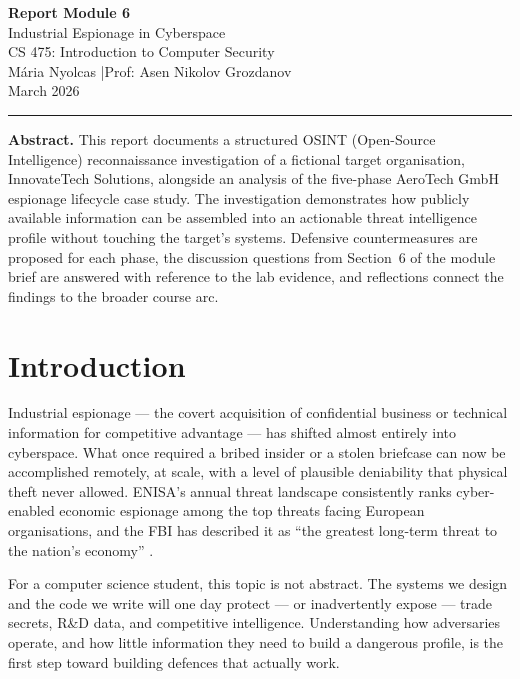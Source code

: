 \documentclass[11pt,a4paper]{article}
\begin{document}
\begin{center}
  {\Large\bfseries Report Module 6}\\[4pt]
  {\large Industrial Espionage in Cyberspace}\\[6pt]
  {\normalsize CS 475: Introduction to Computer Security}\\[2pt]
  {\normalsize Mária Nyolcas \quad|\quad Prof: Asen Nikolov Grozdanov}\\[2pt]
  {\normalsize March 2026}
\end{center}

\vspace{4pt}
\noindent\rule{\linewidth}{0.6pt}
\vspace{2pt}

\noindent\textbf{Abstract.}
This report documents a structured OSINT (Open-Source Intelligence) reconnaissance
investigation of a fictional target organisation, InnovateTech Solutions, alongside an
analysis of the five-phase AeroTech GmbH espionage lifecycle case study.  The investigation
demonstrates how publicly available information can be assembled into an actionable threat
intelligence profile without touching the target's systems.  Defensive countermeasures are
proposed for each phase, the discussion questions from Section~6 of the module brief are
answered with reference to the lab evidence, and reflections connect the findings to the
broader course arc.


\section{Introduction}

Industrial espionage --- the covert acquisition of confidential business or technical
information for competitive advantage --- has shifted almost entirely into cyberspace.
What once required a bribed insider or a stolen briefcase can now be accomplished remotely,
at scale, with a level of plausible deniability that physical theft never allowed.  ENISA's
annual threat landscape consistently ranks cyber-enabled economic espionage among the
top threats facing European organisations, and the FBI has described it as ``the greatest
long-term threat to the nation's economy'' \cite{fbi2023}.

For a computer science student, this topic is not abstract.  The systems we design and the
code we write will one day protect --- or inadvertently expose --- trade secrets, R\&D data,
and competitive intelligence.  Understanding how adversaries operate, and how little
information they need to build a dangerous profile, is the first step toward building
defences that actually work.
\end{document}
